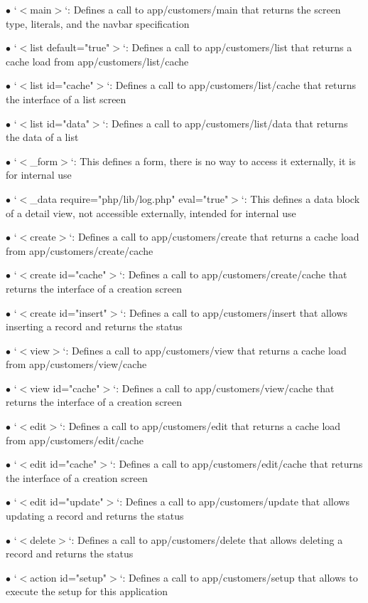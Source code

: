 \documentclass[a4paper]{article}
\begin{document}
\begin{compactitem}
\item[\color{myblue}$\bullet$] `$<$main$>$`: Defines a call to app/customers/main that returns the screen type, literals, and the navbar specification
\item[\color{myblue}$\bullet$] `$<$list default="true"$>$`: Defines a call to app/customers/list that returns a cache load from app/customers/list/cache
\item[\color{myblue}$\bullet$] `$<$list id="cache"$>$`: Defines a call to app/customers/list/cache that returns the interface of a list screen
\item[\color{myblue}$\bullet$] `$<$list id="data"$>$`: Defines a call to app/customers/list/data that returns the data of a list
\item[\color{myblue}$\bullet$] `$<$\_form$>$`: This defines a form, there is no way to access it externally, it is for internal use
\item[\color{myblue}$\bullet$] `$<$\_data require="php/lib/log.php" eval="true"$>$`: This defines a data block of a detail view, not accessible externally, intended for internal use
\item[\color{myblue}$\bullet$] `$<$create$>$`: Defines a call to app/customers/create that returns a cache load from app/customers/create/cache
\item[\color{myblue}$\bullet$] `$<$create id="cache"$>$`: Defines a call to app/customers/create/cache that returns the interface of a creation screen
\item[\color{myblue}$\bullet$] `$<$create id="insert"$>$`: Defines a call to app/customers/insert that allows inserting a record and returns the status
\item[\color{myblue}$\bullet$] `$<$view$>$`: Defines a call to app/customers/view that returns a cache load from app/customers/view/cache
\item[\color{myblue}$\bullet$] `$<$view id="cache"$>$`: Defines a call to app/customers/view/cache that returns the interface of a creation screen
\item[\color{myblue}$\bullet$] `$<$edit$>$`: Defines a call to app/customers/edit that returns a cache load from app/customers/edit/cache
\item[\color{myblue}$\bullet$] `$<$edit id="cache"$>$`: Defines a call to app/customers/edit/cache that returns the interface of a creation screen
\item[\color{myblue}$\bullet$] `$<$edit id="update"$>$`: Defines a call to app/customers/update that allows updating a record and returns the status
\item[\color{myblue}$\bullet$] `$<$delete$>$`: Defines a call to app/customers/delete that allows deleting a record and returns the status
\item[\color{myblue}$\bullet$] `$<$action id="setup"$>$`: Defines a call to app/customers/setup that allows to execute the setup for this application
\end{compactitem}
\end{document}
